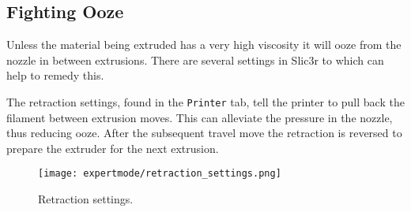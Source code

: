 
\subsection{Fighting Ooze} %
\label{sec:fighting_ooze}

Unless the material being extruded has a very high viscosity it will ooze from the nozzle in between extrusions.  There are several settings in Slic3r to which can help to remedy this.

The retraction settings, found in the \texttt{Printer} tab, tell the printer to pull back the filament between extrusion moves.  This can alleviate the pressure in the nozzle, thus reducing ooze.  After the subsequent travel move the retraction is reversed to prepare the extruder for the next extrusion.

\begin{figure}[H]
\centering
\texttt{[image: expertmode/retraction\_settings.png]}
\caption{Retraction settings.}
\label{fig:retraction_settings}
\end{figure}


